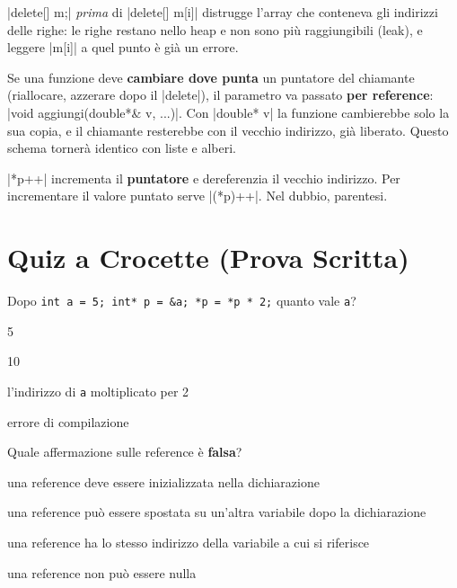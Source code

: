 \begin{trappola}
\cc|delete[] m;| \emph{prima} di \cc|delete[] m[i]| distrugge l'array che
conteneva gli indirizzi delle righe: le righe restano nello heap e non sono più
raggiungibili (leak), e leggere \cc|m[i]| a quel punto è già un errore.
\end{trappola}

\begin{consiglio}
Se una funzione deve \textbf{cambiare dove punta} un puntatore del chiamante
(riallocare, azzerare dopo il \cc|delete|), il parametro va passato
\textbf{per reference}: \cc|void aggiungi(double*& v, ...)|. Con \cc|double* v|
la funzione cambierebbe solo la sua copia, e il chiamante resterebbe con il vecchio
indirizzo, già liberato. Questo schema tornerà identico con liste e alberi.
\end{consiglio}

\begin{consiglio}
\cc|*p++| incrementa il \textbf{puntatore} e dereferenzia il vecchio indirizzo.
Per incrementare il valore puntato serve \cc|(*p)++|. Nel dubbio, parentesi.
\end{consiglio}

\section{Quiz a Crocette (Prova Scritta)}

\begin{quiz}{Dopo \texttt{int a = 5; int* p = \&a; *p = *p * 2;} quanto vale \texttt{a}?}
  \item 5
  \item 10
  \item l'indirizzo di \texttt{a} moltiplicato per 2
  \item errore di compilazione
\end{quiz}

\begin{quiz}{Quale affermazione sulle reference è \textbf{falsa}?}
  \item una reference deve essere inizializzata nella dichiarazione
  \item una reference può essere spostata su un'altra variabile dopo la dichiarazione
  \item una reference ha lo stesso indirizzo della variabile a cui si riferisce
  \item una reference non può essere nulla
\end{quiz}

